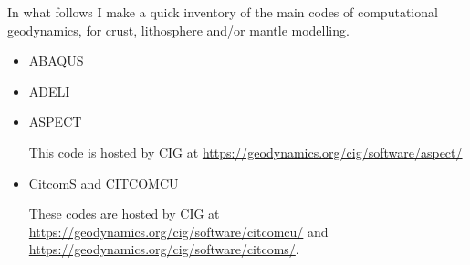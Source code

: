 
In what follows I make a quick inventory of the main codes of computational geodynamics, 
for crust, lithosphere and/or mantle modelling.

\begin{itemize}

\item ABAQUS
\cite{gedh02}
\cite{kuhe09}
\cite{makh09}
\cite{nalr12}
\cite{pevp15}


\item ADELI
\cite{hajc97}
\cite{vech06} 
\cite{boht08a}
\cite{boht08b}
\cite{gech12}
\cite{gigh12}
\cite{wahd13}
\cite{ceag15}

\item ASPECT

This code is hosted by CIG at \url{https://geodynamics.org/cig/software/aspect/}

\cite{bahk07}
\cite{krhb12}
\cite{aupm15}
\cite{tosn15}
\cite{dahe16}
\cite{gadb16}
\cite{zhon16}
\cite{hepb17}
\cite{daef17}
\cite{hedg17}
\cite{robh17}
\cite{robu17}
\cite{aumh17}
\cite{thie17}
\cite{brsg17}
\cite{onmz17}
\cite{tasm17}
\cite{zhli17}
\cite{daga18}
\cite{onzh18}
\cite{gltf18}
\cite{heps18}
\cite{galh18}
\cite{peka18}
\cite{puth18}
\cite{brst18b}
\cite{baba19}
\cite{stbl19}
\cite{cocf19}
\cite{liki19}

\item CitcomS and CITCOMCU

These codes are hosted by CIG at \url{https://geodynamics.org/cig/software/citcomcu/}
and \url{https://geodynamics.org/cig/software/citcoms/}.

\cite{somo96}
\cite{moso98}
\cite{zhgm98}
\cite{vazh99}
\cite{zhzm00}
\cite{gumr00}
\cite{bigu01}
\cite{tagh02}
\cite{vhzh03}
\cite{cogu03}
\cite{bigu03}
\cite{solo04}
\cite{bihi05}
\cite{beck06}
\cite{pibf06}
\cite{tact06}
\cite{besb06}
\cite{coli06}
\cite{bihi07}
\cite{zhzl07}
\cite{magu07}
\cite{zhym07}
\cite{bavi07}
\cite{rimb07}
\cite{mofm07}
\cite{cobs07}
\cite{dihf08}
\cite{gamc08}
\cite{zhmt08}
\cite{hole08}
\cite{lizh09}
\cite{arhm09}
\cite{zhzm09}
\cite{anbi09}
\cite{fobe09}
\cite{bubi09}
\cite{bumb10}
\cite{wibh10}
\cite{baih10}
\cite{bubi10}
\cite{zhzl10}
\cite{befa11}
\cite{lemj11}
\cite{vaal11}
\cite{legu11}
\cite{list11}
\cite{jabi12}
\cite{bija12}
\cite{bova12}
\cite{hucf12}
\cite{solo12}
\cite{hibi12}
\cite{bogs13a}
\cite{bogs13b}
\cite{jabr13}
\cite{qula13}
\cite{oldh13}
\cite{arbi13}
\cite{cost13}
\cite{flgw14}
\cite{budt14}
\cite{kava14}
\cite{arfw14}
\cite{wavp14}
\cite{seki14}
\cite{agvg14}
\cite{mabv14}
\cite{zhu14}
\cite{bogf15}
\cite{bomv15}
\cite{sefw15}
\cite{daso15}
\cite{vami15}
\cite{wazh15}
\cite{wavp15}
\cite{waav15}
\cite{hafg15}
\cite{tarn15}
\cite{legu15}
\cite{welm16}
\cite{wele16}
\cite{maav17}
\cite{frbm17}
\cite{haja17}
\cite{hect18}


\end{itemize}
